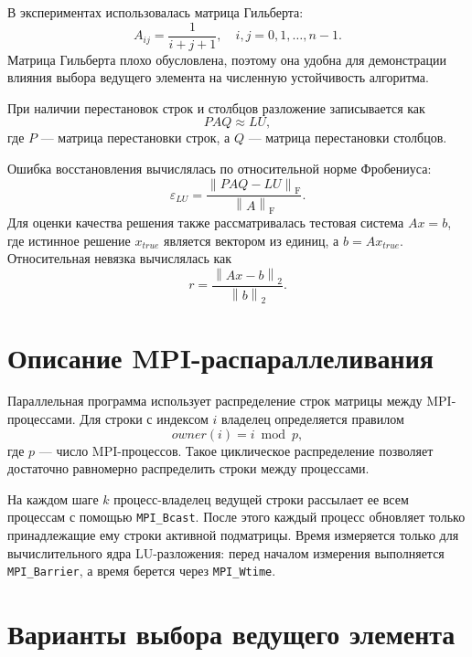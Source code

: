 \documentclass[a4paper,14pt]{extarticle}
\newcommand{\fro}{\mathrm{F}}
\newcommand{\norm}[1]{\left\lVert #1 \right\rVert}
\begin{document}
В экспериментах использовалась матрица Гильберта:
\begin{equation}
    A_{ij} = \frac{1}{i+j+1}, \quad i,j = 0,1,\ldots,n-1.
\end{equation}
Матрица Гильберта плохо обусловлена, поэтому она удобна для демонстрации влияния выбора ведущего элемента на численную устойчивость алгоритма.

При наличии перестановок строк и столбцов разложение записывается как
\begin{equation}
    P A Q \approx L U,
\end{equation}
где $P$ --- матрица перестановки строк, а $Q$ --- матрица перестановки столбцов.

Ошибка восстановления вычислялась по относительной норме Фробениуса:
\begin{equation}
    \varepsilon_{LU} = \frac{\norm{P A Q - L U}_{\fro}}{\norm{A}_{\fro}}.
\end{equation}
Для оценки качества решения также рассматривалась тестовая система $Ax=b$, где истинное решение $x_{true}$ является вектором из единиц, а $b = A x_{true}$. Относительная невязка вычислялась как
\begin{equation}
    r = \frac{\norm{Ax-b}_2}{\norm{b}_2}.
\end{equation}

\section{Описание MPI-распараллеливания}

Параллельная программа использует распределение строк матрицы между MPI-процессами. Для строки с индексом $i$ владелец определяется правилом
\begin{equation}
    owner(i) = i \bmod p,
\end{equation}
где $p$ --- число MPI-процессов. Такое циклическое распределение позволяет достаточно равномерно распределить строки между процессами.

На каждом шаге $k$ процесс-владелец ведущей строки рассылает ее всем процессам с помощью \texttt{MPI\_Bcast}. После этого каждый процесс обновляет только принадлежащие ему строки активной подматрицы. Время измеряется только для вычислительного ядра LU-разложения: перед началом измерения выполняется \texttt{MPI\_Barrier}, а время берется через \texttt{MPI\_Wtime}.

\section{Варианты выбора ведущего элемента}
\end{document}
